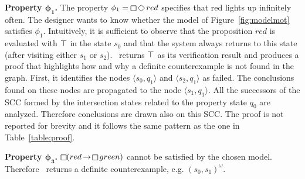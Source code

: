 


\textbf{Property $\boldsymbol{\phi_1}$.}
The property $\phi_1=\LTLglobally \LTLfinally red$ specifies that red lights up infinitely often.
The designer wants to know whether the model of Figure~\ref{fig:modelmot} satisfies $\phi_1$.
Intuitively, it is sufficient to observe that the proposition $red$ is evaluated with $\operatorname{\top}$ in the state $s_0$ and that the system always returns to this state (after visiting either $s_1$ or $s_2$).
\NAME\ returns $\operatorname{\top}$ as its verification result and produces a proof that highlights how and why a definite counterexample is not found in the graph. First, it identifies the nodes $\langle s_0, q_1 \rangle$ and $\langle s_2, q_1 \rangle$ as failed. The conclusions found on these nodes are propagated to the node $\langle s_1, q_1 \rangle$. All the successors of the SCC formed by the intersection states related to the property state $q_0$ are analyzed. Therefore conclusions are drawn also on this SCC. 
The proof is not reported for brevity and it follows the same pattern as the one in Table~\ref{table:proof}.


\textbf{Property $\boldsymbol{\phi_3}$.}
$\LTLglobally (red \LTLimplication \LTLglobally green)$ cannot be satisfied by the chosen model. Therefore \NAME\ returns a definite counterexample, e.g. $(s_0, s_1)^\omega$.

